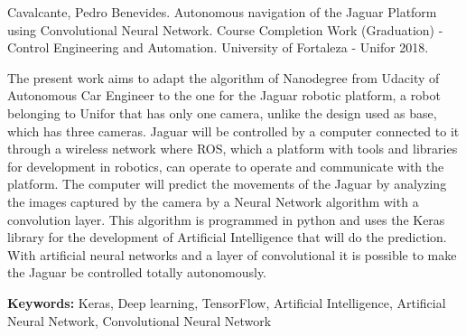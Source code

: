 Cavalcante, Pedro Benevides. Autonomous navigation of the Jaguar Platform using Convolutional Neural Network. Course Completion Work (Graduation) - Control Engineering and Automation. University of Fortaleza - Unifor 2018.

The present work aims to adapt the algorithm of Nanodegree from Udacity of Autonomous Car Engineer to the one for the Jaguar robotic platform, a robot belonging to Unifor that has only one camera, unlike the design used as base, which has three cameras.
Jaguar will be controlled by a computer connected to it through a wireless network where ROS, which a platform with tools and libraries for development in robotics, can operate to operate and communicate with the platform. The computer will predict the movements of the Jaguar by analyzing the images captured by the camera by a Neural Network algorithm with a convolution layer. This algorithm is programmed in python and uses the {Keras} library for the development of Artificial Intelligence that will do the prediction. With artificial neural networks and a layer of convolutional it is possible to make the Jaguar be controlled totally autonomously.


\textbf{Keywords:} {Keras}, {Deep learning}, {TensorFlow}, Artificial Intelligence, Artificial Neural Network, Convolutional Neural Network